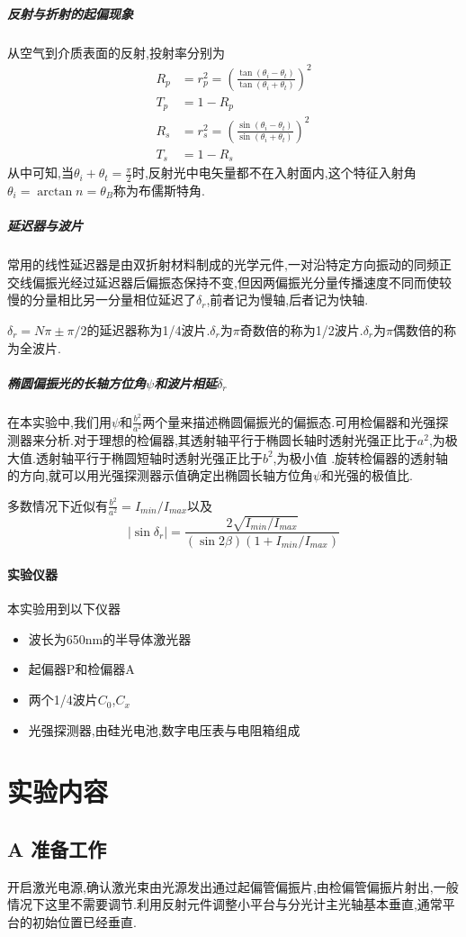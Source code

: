 \documentclass[UTF8,a4paper]{article}%
\begin{document}
\subparagraph{反射与折射的起偏现象}
从空气到介质表面的反射,投射率分别为
\begin{align*}
    R_p & =r_p^2=\left(\frac{\tan(\theta_i-\theta_t)}{\tan(\theta_i+\theta_t)}\right)^2 \\
    T_p & =1-R_p                                                                        \\
    R_s & =r_s^2=\left(\frac{\sin(\theta_i-\theta_t)}{\sin(\theta_i+\theta_t)}\right)^2 \\
    T_s & =1-R_s
\end{align*}
从中可知,当$\theta_i+\theta_t=\frac{\pi}{2}$时,反射光中电矢量都不在入射面内,这个特征入射角$\theta_i=\arctan n=\theta_B$称为布儒斯特角.
\subparagraph{延迟器与波片}
常用的线性延迟器是由双折射材料制成的光学元件,一对沿特定方向振动的同频正交线偏振光经过延迟器后偏振态保持不变,但因两偏振光分量传播速度不同而使较慢的分量相比另一分量相位延迟了$\delta_r$,前者记为慢轴,后者记为快轴.

$\delta_r=N\pi\pm\pi/2$的延迟器称为1/4波片.$\delta_r$为$\pi$奇数倍的称为1/2波片.$\delta_r$为$\pi$偶数倍的称为全波片.
\subparagraph{椭圆偏振光的长轴方位角$\psi$和波片相延$\delta_r$}
在本实验中,我们用$\psi$和$\frac{b^2}{a^2}$两个量来描述椭圆偏振光的偏振态.可用检偏器和光强探测器来分析.对于理想的检偏器,其透射轴平行于椭圆长轴时透射光强正比于$a^2$,为极大值.透射轴平行于椭圆短轴时透射光强正比于$b^2$,为极小值 .旋转检偏器的透射轴的方向,就可以用光强探测器示值确定出椭圆长轴方位角$\psi$和光强的极值比.

多数情况下近似有$\frac{b^2}{a^2}=I_{min}/I_{max}$以及
$$|\sin\delta_r|=\frac{2\sqrt{I_{min}/I_{max}}}{(\sin2\beta)(1+I_{min}/I_{max})}$$
\paragraph{实验仪器}
本实验用到以下仪器
\begin{itemize}
    \item 波长为650$\unit{\nm}$的半导体激光器
    \item 起偏器P和检偏器A
    \item 两个1/4波片$C_0$,$C_x$
    \item 光强探测器,由硅光电池,数字电压表与电阻箱组成
\end{itemize}
\section{实验内容}
\subsection*{A 准备工作}
开启激光电源,确认激光束由光源发出通过起偏管偏振片,由检偏管偏振片射出,一般情况下这里不需要调节.利用反射元件调整小平台与分光计主光轴基本垂直,通常平台的初始位置已经垂直.
\end{document}

